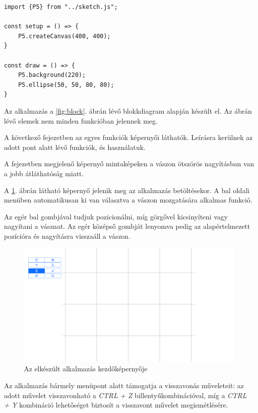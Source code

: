 \begin{lstlisting}[style=es6, morekeywords={P5}]
import {P5} from "../sketch.js";

const setup = () => {
	P5.createCanvas(400, 400);
}

const draw = () => {
	P5.background(220);
	P5.ellipse(50, 50, 80, 80);
}
\end{lstlisting}


Az alkalmazás a \ref{fig:block}. ábrán lévő blokkdiagram alapján készült el. Az ábrán lévő elemek nem minden funkcióban jelennek meg. 

A következő fejezetben az egyes funkciók képernyői láthatók. Leírásra kerülnek az adott pont alatt lévő funkciók, és használatuk.

A fejezetben megjelenő képernyő mintaképeken a vászon ötszörös nagyításban van a jobb átláthatóság miatt.


A \ref{fig:canvas}. ábrán látható képernyő jelenik meg az alkalmazás betöltésekor. A bal oldali menüben automatikusan ki van választva a vászon mozgatására alkalmas funkció.

Az egér bal gombjával tudjuk pozicionálni, míg görgővel kicsinyíteni vagy nagyítani a vásznat. Az egér középső gombját lenyomva pedig az alapértelmezett pozícióra és nagyításra visszaáll a vászon.

\begin{figure}[!h]
	\centering
	\includegraphics[width=\textwidth]{images/editor_canvas.png}
	\caption{Az elkészült alkalmazás kezdőképernyője}
	\label{fig:canvas}
\end{figure}

Az alkalmazás bármely menüpont alatt támogatja a visszavonás műveleteit: az adott művelet visszavonható a \textit{CTRL + Z} billentyűkombinációval, míg a \textit{CTRL + Y} kombináció lehetőséget biztosít a visszavont művelet megismétlésére. 

